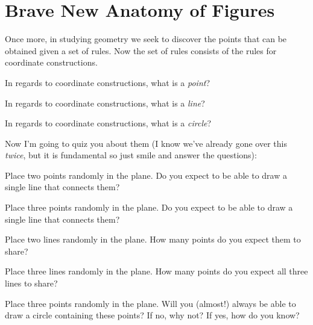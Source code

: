 \newpage


\section{Brave New Anatomy of Figures}

Once more, in studying geometry we seek to discover the points that
can be obtained given a set of rules. Now the set of rules consists of
the rules for coordinate constructions.

\begin{question} 
In regards to coordinate constructions, what is a \textit{point}?
\end{question}
\QM

\begin{question}
In regards to coordinate constructions, what is a \textit{line}?
\end{question}
\QM


\begin{question}
In regards to coordinate constructions, what is a \textit{circle}?
\end{question}
\QM


Now I'm going to quiz you about them (I know we've already gone over
this \textit{twice}, but it is fundamental so just smile and answer
the questions):

\begin{question} 
Place two points randomly in the plane. Do you expect to be able to
draw a single line that connects them?
\end{question}
\QM

\begin{question} 
Place three points randomly in the plane. Do you expect to be able to
draw a single line that connects them?
\end{question}
\QM

\begin{question} 
Place two lines randomly in the plane. How many points do you expect
them to share?
\end{question}
\QM


\begin{question} 
Place three lines randomly in the plane. How many points do you expect
all three lines to share?
\end{question}
\QM


\begin{question} 
Place three points randomly in the plane. Will you (almost!) always be
able to draw a circle containing these points? If no, why not? If yes,
how do you know?
\end{question}
\QM






